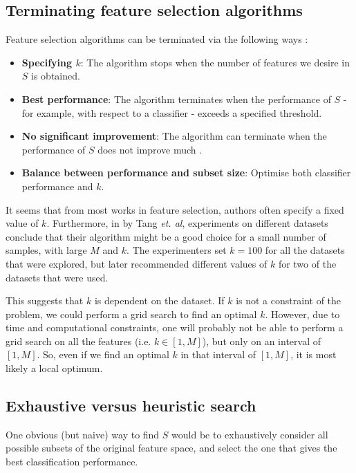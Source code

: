 \documentclass[12pt, twoside, a4paper]{report}
\begin{document}
\subsection{Terminating feature selection algorithms} \label{bg:fs:terminating}

Feature selection algorithms can be terminated via the following ways \cite{RefWorks:210}:
\begin{itemize}
  \item \textbf{Specifying $k$}: The algorithm stops when the number of features we desire in $S$ is obtained.
  \item \textbf{Best performance}: The algorithm terminates when the performance of $S$ - for example, with respect to a classifier - exceeds a specified threshold.
  \item \textbf{No significant improvement}: The algorithm can terminate when the performance of $S$ does not improve much \cite{RefWorks:215}.
  \item \textbf{Balance between performance and subset size}: Optimise both classifier performance and $k$.
\end{itemize}

It seems that from most works in feature selection, authors often specify a fixed value of $k$. Furthermore, in \cite{RefWorks:119} by Tang \textit{et. al}, experiments on different datasets conclude that their algorithm might be a good choice for a small number of samples, with large $M$ and $k$. The experimenters set $k=100$ for all the datasets that were explored, but later recommended different values of $k$ for two of the datasets that were used.

This suggests that $k$ is dependent on the dataset. If $k$ is not a constraint of the problem, we could perform a grid search to find an optimal $k$. However, due to time and computational constraints, one will probably not be able to perform a grid search on all the features (i.e. $k \in [1, M]$), but only on an interval of $[1, M]$. So, even if we find an optimal $k$ in that interval of $[1, M]$, it is most likely a local optimum.


\subsection{Exhaustive versus heuristic search} \label{bg:fs:exhaustive}

One obvious (but naive) way to find $S$ would be to exhaustively consider all possible subsets of the original feature space, and select the one that gives the best classification performance.
\end{document}
